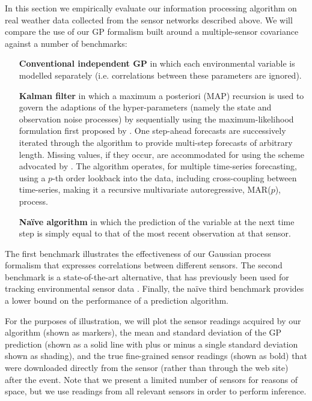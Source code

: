 \documentclass{acmtrans2m}
\begin{document}
\noindent In this section we empirically evaluate our information processing algorithm on real weather data collected from the sensor networks described above. 
We will compare the use of our GP formalism built around a multiple-sensor covariance against a number of benchmarks:
\begin{itemize}
\item[\bf Conventional independent GP\normalfont] in which each environmental variable is modelled separately (i.e. correlations between these parameters are ignored). 
\item[\bf Kalman filter\normalfont] in which a maximum a posteriori
(MAP) recursion is used to govern the adaptions of the hyper-parameters (namely the state and observation noise processes) by sequentially using the maximum-likelihood formulation first proposed by . One step-ahead forecasts are successively iterated through the algorithm to provide multi-step
forecasts of arbitrary length. Missing values, if they occur, are
accommodated for using the scheme advocated by 
.  The algorithm operates, for multiple time-series
forecasting, using a $p$-th order lookback into the data, including
cross-coupling between time-series, making it a recursive multivariate
autoregressive, MAR($p$), process.
\item[\bf Na\"{i}ve algorithm\normalfont] in which the prediction of the variable at the next time step is simply equal to that of the most recent observation at that sensor.
\end{itemize}
The first benchmark illustrates the effectiveness of our Gaussian process formalism that expresses correlations between different sensors. The second benchmark is a state-of-the-art alternative, that has previously been used for tracking environmental sensor data \cite{kalman_oceanography}. Finally, the na\"{i}ve third benchmark provides a lower bound on the performance of a prediction algorithm.

For the purposes of illustration, we will plot the sensor readings acquired by our algorithm (shown as markers), the mean and standard deviation of the GP prediction (shown as a solid line with plus or minus a single standard deviation shown as shading), and the true fine-grained sensor readings (shown as bold) that were downloaded directly from the sensor (rather than through the web site) after the event. Note that we present a limited number of sensors for reasons of space, but we use readings from all relevant sensors in order to perform inference. 
\end{document}
